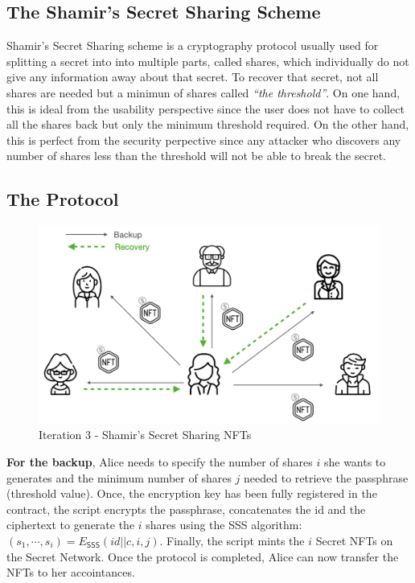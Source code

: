 \documentclass[12pt]{article}
\newcommand{\ms}[1]{\ensuremath{\mathsf{#1}}}
\begin{document}
\subsection{The Shamir's Secret Sharing Scheme}

Shamir's Secret Sharing scheme is a cryptography protocol usually used for splitting a secret into into multiple parts, called shares, which individually do not give any information away about that secret. To recover that secret, not all shares are needed but a minimun of shares called {\em ``the threshold''}. On one hand, this is ideal from the usability perspective since the user does not have to collect all the shares back but only the minimum threshold required. On the other hand, this is perfect from the security perpective since any attacker who discovers any number of shares less than the threshold will not be able to break the secret. \\

\subsection{The Protocol}

\begin{figure}
  \includegraphics[width=\linewidth]{./media/media-005.png}
  \caption{Iteration 3 - Shamir's Secret Sharing NFTs}
  \label{it3:backup}
\end{figure}

{\bf For the backup}, Alice needs to specify the number of shares $i$ she wants to generates and the minimum number of shares $j$ needed to retrieve the passphrase (threshold value). Once, the encryption key has been fully registered in the contract, the script encrypts the passphrase, concatenates the id and the ciphertext to generate the $i$ shares using the SSS algorithm: $(s_1,\cdots,s_i)=E_{\ms{SSS}}(id||c, i, j)$. Finally, the script mints the $i$ Secret NFTs on the Secret Network. Once the protocol is completed, Alice can now transfer the NFTs to her accointances. \\
\end{document}
